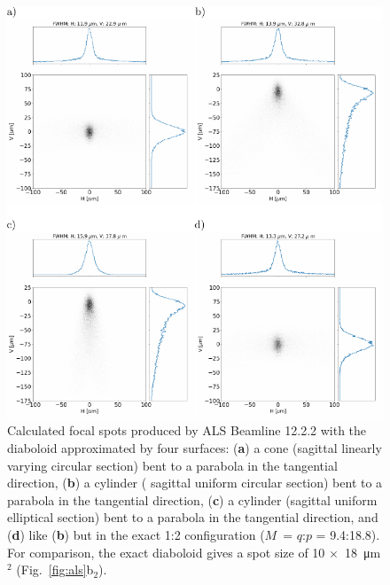 \documentclass[preprint]{iucr}       %
\newcommand{\inred}[1]{{\color{red}#1}}
\begin{document}
\begin{figure}\label{fig:finalcomparison}
\includegraphics[width=1.0\textwidth]{figures/fig9.pdf}
% 


\caption{Calculated focal spots produced by ALS Beamline 12.2.2 with the diaboloid approximated by four surfaces: (\textbf{a}) a cone (\inred{sagittal linearly varying} circular section) bent to a parabola \inred{in the tangential direction}, (\textbf{b}) a cylinder (\inred{ sagittal uniform} circular section) bent to a parabola in the tangential direction, (\textbf{c}) a cylinder (\inred{sagittal uniform} elliptical section) bent to a parabola \inred{in the tangential direction}, and (\textbf{d}) like (\textbf{b}) but in the exact 1:2 configuration ($M$~= $q$:$p$ = 9.4:18.8).
\inred{For comparison, the exact diaboloid gives a spot size of 10 $\times$~\SI{18}{\micro\meter}$^2$ (Fig.~\ref{fig:als}b$_2$).}
}
\end{figure}
\end{document}

